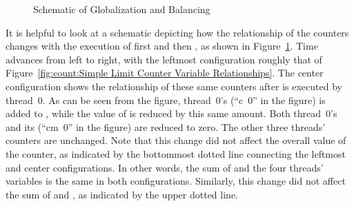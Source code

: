 \QuickQuizEnd

\begin{figure}[tb]
\centering
{}
\caption{Schematic of Globalization and Balancing}
\label{fig:count:Schematic of Globalization and Balancing}
\end{figure}

It is helpful to look at a schematic depicting how the relationship
of the counters changes with the execution of first
 and then , as shown in
Figure~\ref{fig:count:Schematic of Globalization and Balancing}.
Time advances from left to right, with the leftmost configuration
roughly that of
Figure~\ref{fig:count:Simple Limit Counter Variable Relationships}.
The center configuration shows the relationship of these same counters
after  is executed by thread~0.
As can be seen from the figure, thread~0's  (``c~0'' in
the figure) is added to , while the value of
 is reduced by this same amount.
Both thread~0's  and its 
(``cm~0'' in the figure) are reduced to zero.
The other three threads' counters are unchanged.
Note that this change did not affect the overall value of the counter,
as indicated by the bottommost dotted line connecting the leftmost
and center configurations.
In other words, the sum of  and the four threads'
 variables is the same in both configurations.
Similarly, this change did not affect the sum of  and
, as indicated by the upper dotted line.

